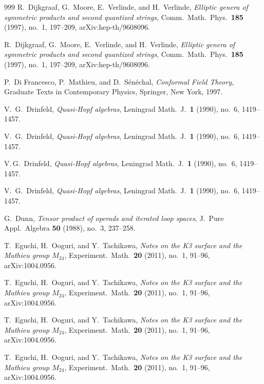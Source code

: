 \documentclass[11pt]{memoir}
\begin{document}
\begin{thebibliography}{999}
R.~Dijkgraaf, G.~Moore, E.~Verlinde, and H.~Verlinde, \emph{Elliptic genera of symmetric products and second quantized strings}, Comm.\ Math.\ Phys.\ \textbf{185} (1997), no.~1, 197--209, arXiv:hep-th/9608096.

R.~Dijkgraaf, G.~Moore, E.~Verlinde, and H.~Verlinde, \emph{Elliptic genera of symmetric products and second quantized strings}, Comm.\ Math.\ Phys.\ \textbf{185} (1997), no.~1, 197--209, arXiv:hep-th/9608096.

P.~Di Francesco, P.~Mathieu, and D.~S\'en\'echal, \emph{Conformal Field Theory}, Graduate Texts in Contemporary Physics, Springer, New York, 1997.

V.~G.~Drinfeld, \emph{Quasi-Hopf algebras}, Leningrad Math.\ J.\ \textbf{1} (1990), no.~6, 1419--1457.

V.~G.~Drinfeld, \emph{Quasi-Hopf algebras}, Leningrad Math.\ J.\ \textbf{1} (1990), no.~6, 1419--1457.

V.\,G.~Drinfeld, \emph{Quasi-Hopf algebras}, Leningrad Math.\ J.\ \textbf{1} (1990), no.~6, 1419--1457.

V.~G.~Drinfeld, \emph{Quasi-Hopf algebras}, Leningrad Math.\ J.\ \textbf{1} (1990), no.~6, 1419--1457.

G.~Dunn, \emph{Tensor product of operads and iterated loop spaces}, J.~Pure Appl.\ Algebra \textbf{50} (1988), no.~3, 237--258.

T.~Eguchi, H.~Ooguri, and Y.~Tachikawa, \emph{Notes on the K3 surface and the Mathieu group $M_{24}$}, Experiment.\ Math.\ \textbf{20} (2011), no.~1, 91--96, arXiv:1004.0956.

T.~Eguchi, H.~Ooguri, and Y.~Tachikawa, \emph{Notes on the K3 surface and the Mathieu group $M_{24}$}, Experiment.\ Math.\ \textbf{20} (2011), no.~1, 91--96, arXiv:1004.0956.

T.~Eguchi, H.~Ooguri, and Y.~Tachikawa, \emph{Notes on the K3 surface and the Mathieu group $M_{24}$}, Experiment.\ Math.\ \textbf{20} (2011), no.~1, 91--96, arXiv:1004.0956.

T.~Eguchi, H.~Ooguri, and Y.~Tachikawa, \emph{Notes on the K3 surface and the Mathieu group $M_{24}$}, Experiment.\ Math.\ \textbf{20} (2011), no.~1, 91--96, arXiv:1004.0956.


\end{thebibliography}
\end{document}
